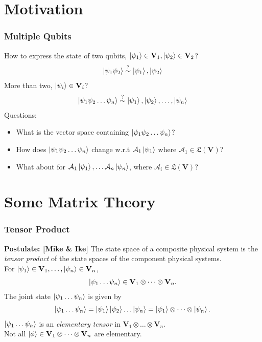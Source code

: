 \documentclass{beamer}
\theoremstyle{definition}
\newcommand{\V}{\mathbf{V}}
\newcommand{\A}{\mathcal{A}}
\begin{document}
\section{Motivation}

\begin{frame}
\frametitle{Multiple Qubits}
How to express the state of two qubits, $\ket{\psi_1}\in \V_1, \ket{\psi_2}\in \V_2$?
\begin{align*}
\left\vert{\psi_1\psi_2}\right\rangle \stackrel{?}{\sim} \left\vert{\psi_1}\right\rangle, \left\vert{\psi_2}\right\rangle
\end{align*}
More than two, $\ket{\psi_i} \in \V_i$?
\begin{align*}
\left\vert{\psi_1\psi_2\dots\psi_n}\right\rangle \stackrel{?}{\sim} \left\vert{\psi_1}\right\rangle,\left\vert{\psi_2}\right\rangle,\dots,\left\vert{\psi_n}\right\rangle
\end{align*}
Questions:
\begin{itemize}
	\item What is the vector space containing $\left\vert{\psi_1\psi_2\dots\psi_n}\right\rangle$?
	\item How does $\left\vert{\psi_1\psi_2\dots\psi_n}\right\rangle$ change w.r.t $\A_1\ket{\psi_1}$ where $\A_1 \in \mathfrak{L}(\V)$?
	\item What about for $\A_1\ket{\psi_1},\dots\A_n\ket{\psi_n}$, where $\A_i \in \mathfrak{L}(\V)$?
\end{itemize}
\end{frame}


















\section{Some Matrix Theory}


\begin{frame}
\frametitle{Tensor Product}
\textbf{Postulate: [Mike \& Ike]} The state space of a composite physical system is the \textit{tensor product} of the state spaces of the component physical systems. \\
$\,$\\
For $\ket{\psi_1}\in \V_1, \dots, \ket{\psi_n}\in \V_n$, 
\begin{align*}
\ket{\psi_1\dots\psi_n} \in \V_1\otimes \dots \otimes \V_n.
\end{align*}
The joint state $\left\vert{\psi_1\dots\psi_n}\right\rangle$ is given by
\begin{align*}
\left\vert{\psi_1\dots\psi_n}\right\rangle = \left\vert{\psi_1}\right\rangle\left\vert{\psi_2}\right\rangle\dots\left\vert{\psi_n}\right\rangle = \left\vert{\psi_1}\right\rangle\otimes \dots \otimes \left\vert{\psi_n}\right\rangle.
\end{align*}
$\left\vert{\psi_1\dots\psi_n}\right\rangle$ is an \textit{elementary tensor} in $\V_1\otimes \dots \otimes \V_n$. \\
$\,$\\
Not all $\ket{\phi} \in \V_1\otimes \dots \otimes \V_n$ are elementary.




\end{frame}
\end{document}
